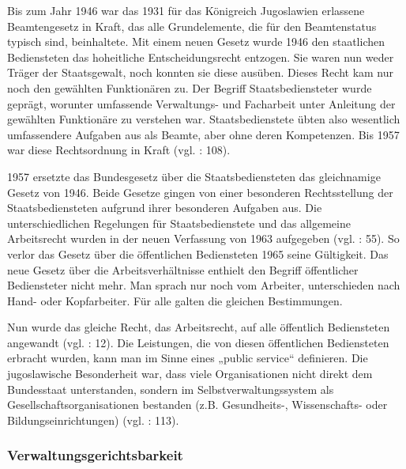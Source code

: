 Bis zum Jahr 1946 war das 1931 für das Königreich Jugoslawien erlassene Beamtengesetz in Kraft, das alle Grundelemente, die für den Beamtenstatus typisch sind, beinhaltete. Mit einem neuen Gesetz wurde 1946 den staatlichen Bediensteten das hoheitliche Entscheidungsrecht entzogen. Sie waren nun weder Träger der Staatsgewalt, noch konnten sie diese ausüben. Dieses Recht kam nur noch den gewählten Funktionären zu. Der Begriff Staatsbediensteter wurde geprägt, worunter umfassende Verwaltungs- und Facharbeit unter Anleitung der gewählten Funktionäre zu verstehen war. Staatsbedienstete übten also wesentlich umfassendere Aufgaben aus als Beamte, aber ohne deren Kompetenzen. Bis 1957 war diese Rechtsordnung in Kraft (vgl. \cite{vavpetic}: 108).\par
1957 ersetzte das Bundesgesetz über die Staatsbediensteten das gleichnamige Gesetz von 1946. Beide Gesetze gingen von einer besonderen Rechtsstellung der Staatsbediensteten aufgrund ihrer besonderen Aufgaben aus. Die unterschiedlichen Regelungen für Staatsbedienstete und das allgemeine Arbeitsrecht wurden in der neuen Verfassung von 1963 aufgegeben (vgl. \cite{sevic}: 55). So verlor das Gesetz über die öffentlichen Bediensteten 1965 seine Gültigkeit. Das neue Gesetz über die Arbeitsverhältnisse enthielt den Begriff öffentlicher Bediensteter nicht mehr. Man sprach nur noch vom Arbeiter, unterschieden nach Hand- oder Kopfarbeiter. Für alle galten die gleichen Bestimmungen. \par
Nun wurde das gleiche Recht, das Arbeitsrecht, auf alle öffentlich Bediensteten angewandt (vgl. \cite{markic}: 12). Die Leistungen, die von diesen öffentlichen Bediensteten erbracht wurden, kann man im Sinne eines „public service“ definieren. Die jugoslawische Besonderheit war, dass viele Organisationen nicht direkt dem Bundesstaat unterstanden, sondern im Selbstverwaltungssystem als Gesellschaftsorganisationen bestanden (z.B. Gesundheits-, Wissenschafts- oder Bildungseinrichtungen) (vgl. \cite{vavpetic}: 113).

\subsubsection{Verwaltungsgerichtsbarkeit }

